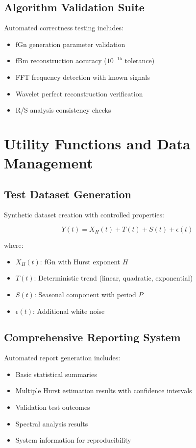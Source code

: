 \documentclass[11pt,a4paper]{article}
\begin{document}
\subsection{Algorithm Validation Suite}

Automated correctness testing includes:
\begin{itemize}
    \item fGn generation parameter validation
    \item fBm reconstruction accuracy ($10^{-15}$ tolerance)
    \item FFT frequency detection with known signals
    \item Wavelet perfect reconstruction verification
    \item R/S analysis consistency checks
\end{itemize}

\section{Utility Functions and Data Management}

\subsection{Test Dataset Generation}

Synthetic dataset creation with controlled properties:

\begin{equation}
Y(t) = X_H(t) + T(t) + S(t) + \epsilon(t)
\end{equation}

where:
\begin{itemize}
    \item $X_H(t)$: fGn with Hurst exponent $H$
    \item $T(t)$: Deterministic trend (linear, quadratic, exponential)
    \item $S(t)$: Seasonal component with period $P$
    \item $\epsilon(t)$: Additional white noise
\end{itemize}

\subsection{Comprehensive Reporting System}

Automated report generation includes:
\begin{itemize}
    \item Basic statistical summaries
    \item Multiple Hurst estimation results with confidence intervals
    \item Validation test outcomes
    \item Spectral analysis results
    \item System information for reproducibility
\end{itemize}
\end{document}
